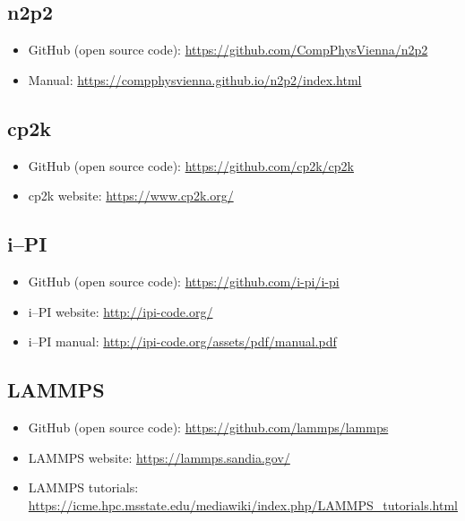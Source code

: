 \documentclass[12pt]{article}
\begin{document}
\subsection{n2p2}
\begin{itemize}
    \item GitHub (open source code): \url{https://github.com/CompPhysVienna/n2p2}
    \item Manual: \url{https://compphysvienna.github.io/n2p2/index.html}
\end{itemize}
\subsection{cp2k}
\begin{itemize}
    \item GitHub (open source code): \url{https://github.com/cp2k/cp2k}
    \item cp2k website: \url{https://www.cp2k.org/}
\end{itemize}
\subsection{i--PI}
\begin{itemize}
    \item GitHub (open source code): \url{https://github.com/i-pi/i-pi}
    \item i--PI website: \url{http://ipi-code.org/}
    \item i--PI manual: \url{http://ipi-code.org/assets/pdf/manual.pdf}
\end{itemize}
\subsection{LAMMPS}
\begin{itemize}
    \item GitHub (open source code): \url{https://github.com/lammps/lammps}
    \item LAMMPS website: \url{https://lammps.sandia.gov/}
    \item LAMMPS tutorials: \url{https://icme.hpc.msstate.edu/mediawiki/index.php/LAMMPS_tutorials.html}
\end{itemize}
\end{document}
